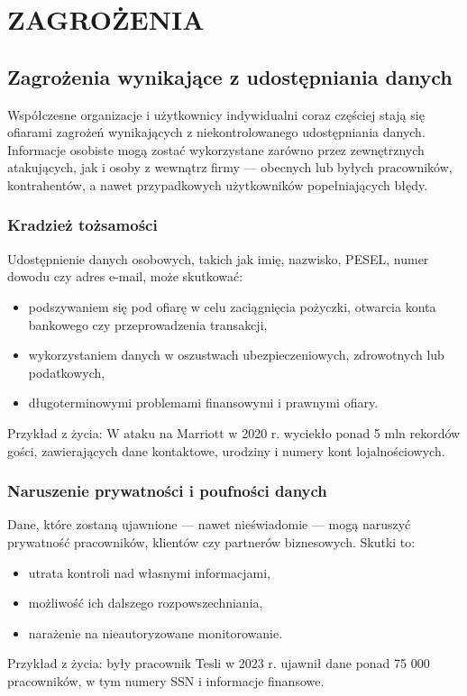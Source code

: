 \chapter{ZAGROŻENIA}
\section{Zagrożenia wynikające z udostępniania danych}

Współczesne organizacje i użytkownicy indywidualni coraz częściej stają się ofiarami zagrożeń wynikających z niekontrolowanego udostępniania danych. Informacje osobiste mogą zostać wykorzystane zarówno przez zewnętrznych atakujących, jak i osoby z wewnątrz firmy — obecnych lub byłych pracowników, kontrahentów, a nawet przypadkowych użytkowników popełniających błędy.

\subsection{Kradzież tożsamości}
Udostępnienie danych osobowych, takich jak imię, nazwisko, PESEL, numer dowodu czy adres e-mail, może skutkować:
\begin{itemize}
\item podszywaniem się pod ofiarę w celu zaciągnięcia pożyczki, otwarcia konta bankowego czy przeprowadzenia transakcji,
\item wykorzystaniem danych w oszustwach ubezpieczeniowych, zdrowotnych lub podatkowych,
\item długoterminowymi problemami finansowymi i prawnymi ofiary.
\end{itemize}

Przykład z życia: W ataku na Marriott w 2020 r. wyciekło ponad 5 mln rekordów gości, zawierających dane kontaktowe, urodziny i numery kont lojalnościowych.

\subsection{Naruszenie prywatności i poufności danych}
Dane, które zostaną ujawnione — nawet nieświadomie — mogą naruszyć prywatność pracowników, klientów czy partnerów biznesowych. Skutki to:
\begin{itemize}
\item utrata kontroli nad własnymi informacjami,
\item możliwość ich dalszego rozpowszechniania,
\item narażenie na nieautoryzowane monitorowanie.
\end{itemize}
Przykład z życia: były pracownik Tesli w 2023 r. ujawnił dane ponad 75 000 pracowników, w tym numery SSN i informacje finansowe.

